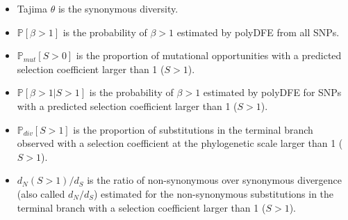 \documentclass{article}
\newcommand{\dn}{d_N}
\newcommand{\ds}{d_S}
\newcommand{\dnds}{\dn / \ds}
\newcommand{\Sphy}{S}
\newcommand{\Spop}{\beta}
\begin{document}
    \begin{itemize}
        \item Tajima $\theta$ is the synonymous diversity.
        \item $\mathbb{P} [ \Spop > 1 ]$ is the probability of $\Spop > 1$ estimated by polyDFE from all SNPs.
        \item $\mathbb{P}_{mut}[\Sphy > 0]$ is the proportion of mutational opportunities with a predicted selection coefficient larger than 1 ($\Sphy > 1$).
        \item $\mathbb{P} [ \Spop > 1  | \Sphy > 1]$ is the probability of $\Spop > 1$ estimated by polyDFE for SNPs with a predicted selection coefficient larger than 1 ($\Sphy > 1$).
        \item $\mathbb{P}_{div}[\Sphy > 1]$ is the proportion of substitutions in the terminal branch observed with a selection coefficient at the phylogenetic scale larger than 1 ($\Sphy > 1$).
        \item $\dn(\Sphy > 1) / \ds$ is the ratio of non-synonymous over synonymous divergence (also called $\dnds$) estimated for the non-synonymous substitutions in the terminal branch with a selection coefficient larger than 1 ($\Sphy > 1$).
    \end{itemize}
\end{document}
